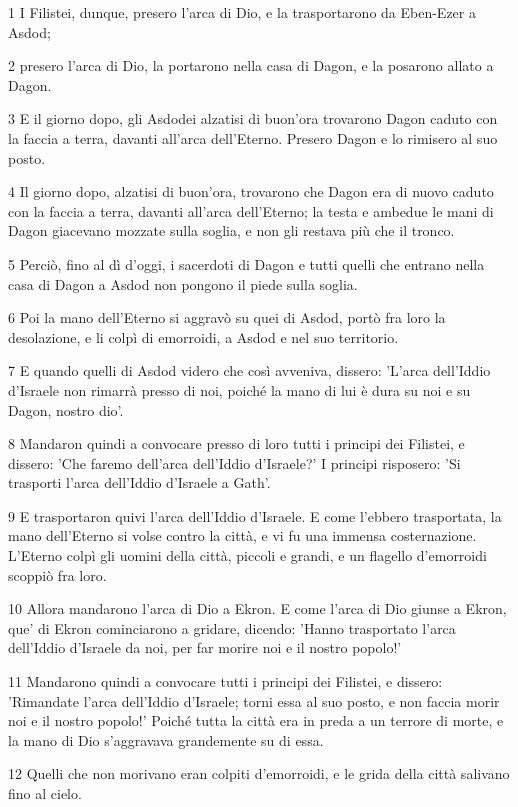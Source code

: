 \par 1 I Filistei, dunque, presero l'arca di Dio, e la trasportarono da Eben-Ezer a Asdod;
\par 2 presero l'arca di Dio, la portarono nella casa di Dagon, e la posarono allato a Dagon.
\par 3 E il giorno dopo, gli Asdodei alzatisi di buon'ora trovarono Dagon caduto con la faccia a terra, davanti all'arca dell'Eterno. Presero Dagon e lo rimisero al suo posto.
\par 4 Il giorno dopo, alzatisi di buon'ora, trovarono che Dagon era di nuovo caduto con la faccia a terra, davanti all'arca dell'Eterno; la testa e ambedue le mani di Dagon giacevano mozzate sulla soglia, e non gli restava più che il tronco.
\par 5 Perciò, fino al dì d'oggi, i sacerdoti di Dagon e tutti quelli che entrano nella casa di Dagon a Asdod non pongono il piede sulla soglia.
\par 6 Poi la mano dell'Eterno si aggravò su quei di Asdod, portò fra loro la desolazione, e li colpì di emorroidi, a Asdod e nel suo territorio.
\par 7 E quando quelli di Asdod videro che così avveniva, dissero: 'L'arca dell'Iddio d'Israele non rimarrà presso di noi, poiché la mano di lui è dura su noi e su Dagon, nostro dio'.
\par 8 Mandaron quindi a convocare presso di loro tutti i principi dei Filistei, e dissero: 'Che faremo dell'arca dell'Iddio d'Israele?' I principi risposero: 'Si trasporti l'arca dell'Iddio d'Israele a Gath'.
\par 9 E trasportaron quivi l'arca dell'Iddio d'Israele. E come l'ebbero trasportata, la mano dell'Eterno si volse contro la città, e vi fu una immensa costernazione. L'Eterno colpì gli uomini della città, piccoli e grandi, e un flagello d'emorroidi scoppiò fra loro.
\par 10 Allora mandarono l'arca di Dio a Ekron. E come l'arca di Dio giunse a Ekron, que' di Ekron cominciarono a gridare, dicendo: 'Hanno trasportato l'arca dell'Iddio d'Israele da noi, per far morire noi e il nostro popolo!'
\par 11 Mandarono quindi a convocare tutti i principi dei Filistei, e dissero: 'Rimandate l'arca dell'Iddio d'Israele; torni essa al suo posto, e non faccia morir noi e il nostro popolo!' Poiché tutta la città era in preda a un terrore di morte, e la mano di Dio s'aggravava grandemente su di essa.
\par 12 Quelli che non morivano eran colpiti d'emorroidi, e le grida della città salivano fino al cielo.

